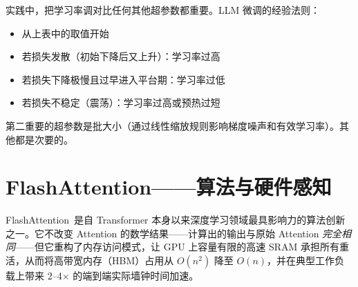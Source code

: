 \begin{intuitionbox}[学习率是最重要的超参数]
实践中，把学习率调对比任何其他超参数都重要。LLM 微调的经验法则：

\begin{itemize}
  \item 从上表中的取值开始
  \item 若损失发散（初始下降后又上升）：学习率过高
  \item 若损失下降极慢且过早进入平台期：学习率过低
  \item 若损失不稳定（震荡）：学习率过高或预热过短
\end{itemize}

第二重要的超参数是批大小（通过线性缩放规则影响梯度噪声和有效学习率）。其他都是次要的。
\end{intuitionbox}

\section{FlashAttention——算法与硬件感知}
\label{flash-attention-algorithm-and-hardware-awareness}

FlashAttention~\cite{dao2022flashattention, dao2023flashattention2}是自 Transformer 本身以来深度学习领域最具影响力的算法创新之一。它不改变 Attention 的数学结果——计算出的输出与原始 Attention \emph{完全相同}——但它重构了内存访问模式，让 GPU 上容量有限的高速 SRAM 承担所有重活，从而将高带宽内存（HBM）占用从 $O(n^2)$ 降至 $O(n)$，并在典型工作负载上带来 2--4$\times$ 的端到端实际墙钟时间加速。

